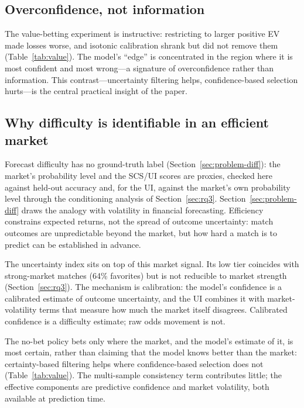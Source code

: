 \documentclass[10pt]{article}
\begin{document}
\subsection{Overconfidence, not information}
The value-betting experiment is instructive: restricting to larger positive EV
made losses worse, and isotonic calibration shrank but did not remove them
(Table~\ref{tab:value}). The model's ``edge'' is concentrated in the region
where it is most confident and most wrong---a signature of overconfidence rather
than information. This contrast---uncertainty filtering helps, confidence-based
selection hurts---is the central practical insight of the paper.

\subsection{Why difficulty is identifiable in an efficient market}
Forecast difficulty has no ground-truth label (Section~\ref{sec:problem-diff}):
the market's probability level and the SCS/UI scores are proxies, checked here
against held-out accuracy and, for the UI, against the market's own probability
level through the conditioning analysis of Section~\ref{sec:rq3}.
Section~\ref{sec:problem-diff} draws the analogy with volatility in financial
forecasting. Efficiency constrains expected returns, not the spread of outcome
uncertainty: match outcomes are unpredictable beyond the market, but how hard a
match is to predict can be established in advance.

The uncertainty index sits on top of this market signal. Its low tier coincides
with strong-market matches (64\% favorites) but is not reducible to market
strength (Section~\ref{sec:rq3}). The mechanism is calibration: the model's
confidence is a calibrated estimate of outcome uncertainty, and the UI combines
it with market-volatility terms that measure how much the market itself
disagrees. Calibrated confidence is a difficulty estimate; raw odds movement is
not.

The no-bet policy bets only where the market, and the model's estimate of it, is
most certain, rather than claiming that the model knows better than the market:
certainty-based filtering helps where confidence-based selection does not
(Table~\ref{tab:value}). The multi-sample consistency term contributes little;
the effective components are predictive confidence and market volatility, both
available at prediction time.
\end{document}
